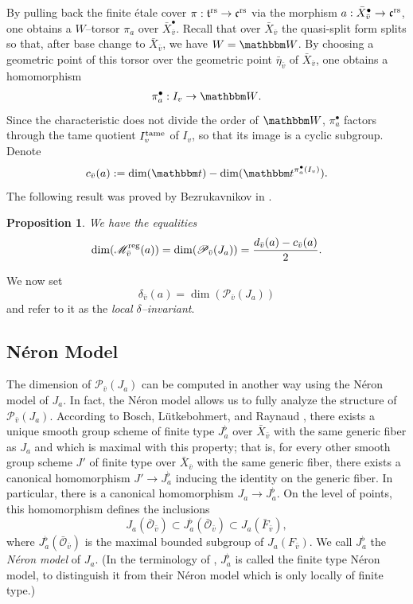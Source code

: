 \documentclass[12pt,english]{smfart}
\numberwithin{equation}{subsection}
\newtheorem{proposition}[equation]{Proposition}
\theoremstyle{remark}
\newcommand\calP{{\mathscr P}}
\newcommand\calM{{\mathscr M}}
\newcommand\calO{{\mathscr O}}
\newcommand\frakt{{\mathfrak t}}
\newcommand\frakc{{\mathfrak c}}
\newcommand\bbW{{\mathbbm W}}
\newcommand\bbt{{\mathbbm t}}
\newcommand\rs{{\rm rs}}
\newcommand\reg{{\rm reg}}
\begin{document}
By pulling back the finite \'etale cover $\pi:\frakt^\rs\to\frakc^\rs$ via the morphism $a:\bar X_{\bar v}^\bullet\to \frakc^\rs$, one obtains a $W$--torsor $\pi_a$ over $\bar X_{\bar v}^\bullet$. Recall that over $\bar X_{\bar v}$ the quasi-split form splits so that, after base change to $\bar X_{\bar v}$, we have $W=\bbW$. By choosing a geometric point of this torsor over the geometric point $\bar\eta_{\bar v}$ of $\bar X_{\bar v}$, one obtains a homomorphism
\begin{equation}\label{pi_a^bullet}
\pi_a^\bullet: I_v \to \bbW.
\end{equation}
Since the characteristic does not divide the order of $\bbW$, $\pi_a^\bullet$ factors through the tame quotient $I_v^{\rm tame}$ of $I_v$, so that its image is a cyclic subgroup. Denote
\begin{equation}\label{c_v(a)}
c_{\bar v}(a):=\dim(\bbt) - \dim(\bbt^{\pi_a^\bullet(I_v)}).
\end{equation}
The following result was proved by Bezrukavnikov in \cite{Bz}.

\begin{proposition}\label{dimension Bezru}
We have the equalities
$$\dim(\calM^\reg_{\bar v}(a))=\dim(\calP_{\bar v}(J_a))=\frac{d_{\bar v}(a)-c_{\bar v}(a)}{2}.$$
\end{proposition}

We now set
$$
\delta_{\bar v}(a)=\dim(\calP_{\bar v}(J_a))
$$
and refer to it as the \emph{local $\delta$--invariant}.

\subsection{N\'eron Model}
\label{subsection : Modele de Neron}

The dimension of $\calP_{\bar v}(J_a)$ can be computed in another way using the N\'eron model of $J_a$. In fact, the N\'eron model allows us to fully analyze the structure of $\calP_{\bar v}(J_a)$. According to Bosch, L\"{u}tkebohmert, and Raynaud \cite{BLR}, there exists a unique smooth group scheme of finite type $J_a^\flat$ over $\bar X_{\bar v}$ with the same generic fiber as $J_a$ and which is maximal with this property; that is, for every other smooth group scheme $J'$ of finite type over $\bar X_{\bar v}$ with the same generic fiber, there exists a canonical homomorphism $J'\to J_a^\flat$ inducing the identity on the generic fiber. In particular, there is a canonical homomorphism $J_a\to J_a^\flat$. On the level of points, this homomorphism defines the inclusions
$$
J_a(\bar\calO_{\bar v})\subset J_a^\flat(\bar\calO_{\bar v})\subset J_a(\bar F_{\bar v}),
$$
where $J_a^\flat(\bar\calO_{\bar v})$ is the maximal bounded subgroup of $J_a(F_{\bar v})$. We call $J_a^\flat$ the \emph{N\'eron model} of $J_a$. (In the terminology of \cite{BLR}, $J_a^\flat$ is called the finite type N\'eron model, to distinguish it from their N\'eron model which is only locally of finite type.)
\end{document}
